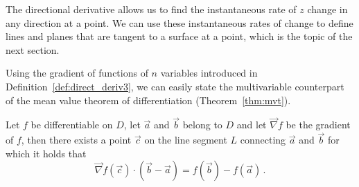 The directional derivative allows us to find the instantaneous rate of $z$ change in any direction at a point. We can use these instantaneous rates of change to define lines and planes that are tangent to a surface at a point, which is the topic of the next section.

\ifanalysis


  Using the gradient of functions of $n$ variables introduced in Definition~\ref{def:direct_deriv3}, we can easily state the multivariable counterpart of the mean value theorem of differentiation (Theorem~\ref{thm:mvt}). 
\pagebreak
  \begin{theorem}\label{thm:mvtmulti}

Let $f$ be differentiable on $D$, let $\vec{a}$ and $\vec{b}$ belong to $D$ and let $\vec{\nabla} f$ be the gradient of $f$, then there exists a point $\vec{c}$ on the line segment $L$ connecting $\vec{a}$ and $\vec{b}$ for which it holds that
$$
\vec{\nabla} f(\vec{c})\cdot\left(\vec{b}-\vec{a}\right)=f(\vec{b})-f(\vec{a})\,.
$$

\end{theorem}

